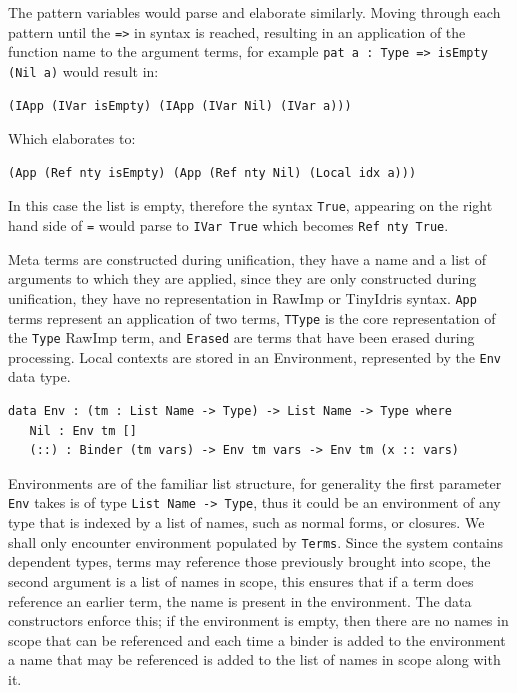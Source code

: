\documentclass[a4paper]{article}
\begin{document}
The pattern variables would parse and elaborate similarly. Moving through each pattern until the 
\texttt{=>} in syntax is reached, resulting in an application of the function name to the argument terms, for example
\texttt{pat a : Type => isEmpty (Nil a)} would result in:

\begin{center}
  \begin{verbatim} 
(IApp (IVar isEmpty) (IApp (IVar Nil) (IVar a)))
\end{verbatim}
\end{center}

Which elaborates to:

\begin{center}
  \begin{verbatim} 
(App (Ref nty isEmpty) (App (Ref nty Nil) (Local idx a)))
\end{verbatim}
\end{center}

In this case
the list is empty, therefore the syntax \texttt{True}, appearing on the right hand side of \texttt{=} would parse to
\texttt{IVar True} which becomes \texttt{Ref nty True}. 

Meta terms are constructed during unification, they have a name and a
list of arguments to which they are applied, since they are only
constructed during unification, they have no representation in RawImp or
TinyIdris syntax. \texttt{App} terms represent an application of two terms,
\texttt{TType} is the core representation of the \texttt{Type} RawImp term, and
\texttt{Erased} are terms that have been erased during processing.
Local contexts are stored in an Environment, represented by the \texttt{Env}
data type.

\begin{center}
\begin{verbatim}
data Env : (tm : List Name -> Type) -> List Name -> Type where
   Nil : Env tm []
   (::) : Binder (tm vars) -> Env tm vars -> Env tm (x :: vars)
\end{verbatim}
\end{center}

Environments are of the familiar list structure, for generality the 
first parameter \texttt{Env} takes is of type \texttt{List Name -> Type}, thus it 
could be an environment of any type that is indexed by a list of names,
such as normal forms, or closures. We shall only encounter 
environment populated by \texttt{Terms}. Since the system contains dependent types, 
terms may reference those previously brought into scope, the second
argument is a list of names in scope, this ensures that if a term does 
reference an earlier term, the name is present in the environment. The data 
constructors enforce this; if the environment is empty, then there are 
no names in scope that can be referenced and each time a binder is added
to the environment a name that may be referenced is added to the 
list of names in scope along with it.
\end{document}
